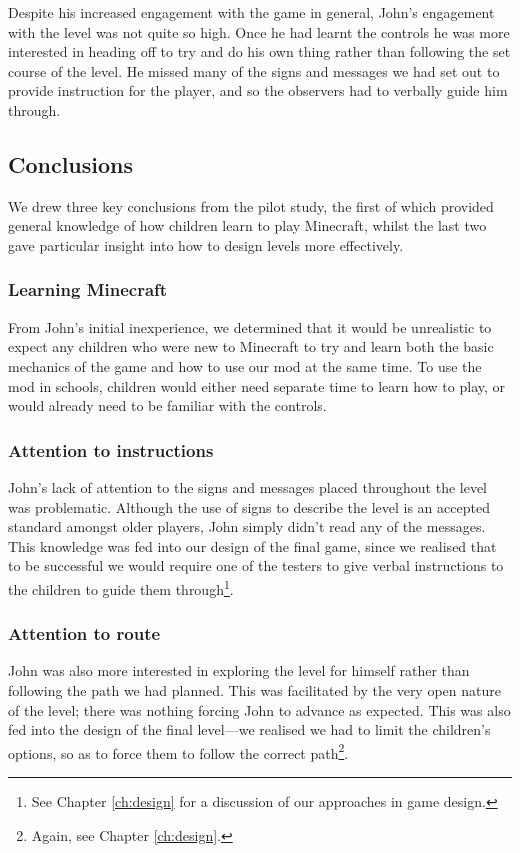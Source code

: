 Despite his increased engagement with the game in general, John's engagement with the
level was not quite so high. Once he had learnt the controls he was more interested
in heading off to try and do his own thing rather than following the set course of
the level. He missed many of the signs and messages we had set out to provide
instruction for the player, and so the observers had to verbally guide him through.

\subsection{Conclusions}
We drew three key conclusions from the pilot study, the first of which provided
general knowledge of how children learn to play Minecraft, whilst the last two gave
particular insight into how to design levels more effectively.

\subsubsection{Learning Minecraft}
From John's initial inexperience, we determined that it would be unrealistic to
expect any children who were new to Minecraft to try and learn both the basic
mechanics of the game and how to use our mod at the same time. To use the mod
in schools, children would either need separate time to learn how to play,
or would already need to be familiar with the controls.

\subsubsection{Attention to instructions}
John's lack of attention to the signs and messages placed throughout the level
was problematic. Although the use of signs to describe the level is an accepted
standard amongst older players, John simply didn't read any of the messages. This
knowledge was fed into our design of the final game, since we realised
that to be successful we would require one of the testers to give verbal instructions
to the children to guide them through\footnote{See Chapter \ref{ch:design} for
a discussion of our approaches in game design.}.

\subsubsection{Attention to route}
John was also more interested in exploring the level for himself rather than following
the path we had planned. This was facilitated by the very open nature of the level;
there was nothing forcing John to advance as expected. This was also fed into the
design of the final level---we realised we had to limit the children's options, so
as to force them to follow the correct path\footnote{Again, see Chapter \ref{ch:design}.}.



